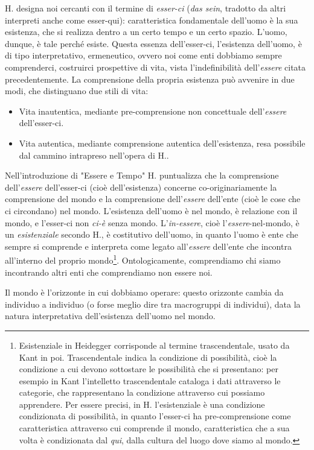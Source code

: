 \documentclass[a4paper,12pt,oneside]{article}%
\begin{document}
H. designa noi cercanti con il termine di \textit{esser-ci} (\textit{das sein}, tradotto da altri interpreti anche come esser-qui): caratteristica fondamentale dell’uomo è la sua esistenza, che si realizza dentro a un certo tempo e un certo spazio. L’uomo, dunque, è tale perché esiste. Questa essenza dell'esser-ci, l'esistenza dell'uomo, è di tipo interpretativo, ermeneutico, ovvero noi come enti dobbiamo sempre comprenderci, costruirci prospettive di vita, vista l'indefinibilità dell'\textit{essere} citata precedentemente. La comprensione della propria esistenza può avvenire in due modi, che distinguano due stili di vita:

\begin{itemize}
	\item Vita inautentica, mediante pre-comprensione non concettuale dell'\textit{essere} dell'esser-ci.
	\item Vita autentica, mediante comprensione autentica dell'esistenza, resa possibile dal cammino intrapreso nell'opera di H..
\end{itemize} 
	
Nell'introduzione di "Essere e Tempo" H. puntualizza che la comprensione dell'\textit{essere} dell'esser-ci (cioè dell'esistenza) concerne co-originariamente la comprensione del mondo e la comprensione dell'\textit{essere} dell'ente (cioè le cose che ci circondano) nel mondo. L'esistenza dell'uomo è nel mondo, è relazione con il mondo, e l'esser-ci non \textit{ci-è} senza mondo. L'\textit{in-essere}, cioè l'\textit{essere}-nel-mondo, è un \textit{esistenziale} secondo H., è costitutivo dell'uomo, in quanto l'uomo è ente che sempre si comprende e interpreta come legato all'\textit{essere} dell'ente che incontra all'interno del proprio mondo\footnote{Esistenziale in Heidegger corrisponde al termine trascendentale, usato da Kant in poi. Trascendentale indica la condizione di possibilità, cioè la condizione a cui devono sottostare le possibilità che si presentano: per esempio in Kant l'intelletto trascendentale cataloga i dati attraverso le categorie, che rappresentano la condizione attraverso cui possiamo apprendere. Per essere precisi, in H. l'esistenziale è una condizione condizionata di possibilità, in quanto l'esser-ci ha pre-comprensione come caratteristica attraverso cui comprende il mondo, caratteristica che a sua volta è condizionata dal \textit{qui}, dalla cultura del luogo dove siamo al mondo.}. Ontologicamente, comprendiamo chi siamo incontrando altri enti che comprendiamo non essere noi.

Il mondo è l'orizzonte in cui dobbiamo operare: questo orizzonte cambia da individuo a individuo (o forse meglio dire tra macrogruppi di individui), data la natura interpretativa dell'esistenza dell'uomo nel mondo.
\end{document}
